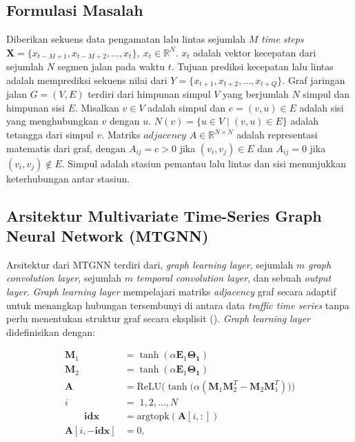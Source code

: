 \subsection{Formulasi Masalah}
\label{subsec:traffic-forecasting-problem-formulation}
Diberikan sekuens data pengamatan lalu lintas sejumlah $M$ \textit{time steps} $\textbf{X}=\{x_{t-M+1},x_{t-M+2},\ldots,x_{t} \}, \ x_t\in \mathbb{R}^N$. $x_t$ adalah vektor kecepatan dari sejumlah $N$ segmen jalan pada waktu $t$. Tujuan prediksi kecepatan lalu lintas adalah memprediksi sekuens nilai dari $Y=\{x_{t+1},x_{t+2},\ldots,x_{t+Q}\}$. Graf jaringan jalan $G=(V,E)$ terdiri dari himpunan simpul $V$ yang berjumlah $N$ simpul  dan himpunan sisi $E$. Misalkan $v\in V$ adalah simpul dan $e=(v,u)\in E$ adalah sisi yang menghubungkan $v$ dengan $u$. $N(v)=\{u\in V\mid (v,u)\in E\}$ adalah tetangga dari simpul $v$. Matriks $adjacency$ $A\in \mathbb{R}^{N\times N}$ adalah representasi matematis dari graf, dengan $A_{ij}=c>0$ jika $(v_i,v_j)\in E$ dan $A_{ij}=0$ jika $(v_i,v_j)\notin E$. Simpul adalah stasiun pemantau lalu lintas dan sisi menunjukkan keterhubungan antar stasiun.

\subsection{Arsitektur Multivariate Time-Series Graph Neural Network (MTGNN)}
\label{subsec:traffic-forecasting-mtgnn-architecture}
Arsitektur dari MTGNN terdiri dari, \textit{graph learning layer}, sejumlah $m$ \textit{graph convolution layer}, sejumlah $m$ \textit{temporal convolution layer}, dan sebuah \textit{output layer}. \textit{Graph learning layer} mempelajari matriks \textit{adjacency} graf secara adaptif untuk menangkap hubungan tersembunyi di antara data \textit{traffic time series} tanpa perlu menentukan struktur graf secara eksplisit (\cite{Wu2020}). \textit{Graph learning layer} didefinisikan dengan:

\begin{align}
    \mathbf{M}_1 &= \tanh(\alpha \mathbf{E}_1 \mathbf{\Theta_1})\\
    \mathbf{M}_2 &= \tanh(\alpha \mathbf{E}_1 \mathbf{\Theta_1})\\
    \mathbf{A} &= \mathrm{ReLU}\bigl(\tanh\bigl(\alpha(\mathbf{M}_1\mathbf{M}_2^{T}-\mathbf{M}_2\mathbf{M}_1^{T})\bigr)\bigr) \\ 
    i \; &= \; 1,2,\ldots,N \\
   \hspace{2em}  \mathbf{idx} &= \mathrm{argtopk}(\mathbf{A}[i,:])\\
     \mathbf{A}[i,-\mathbf{idx}] &= 0, 
\end{align}

